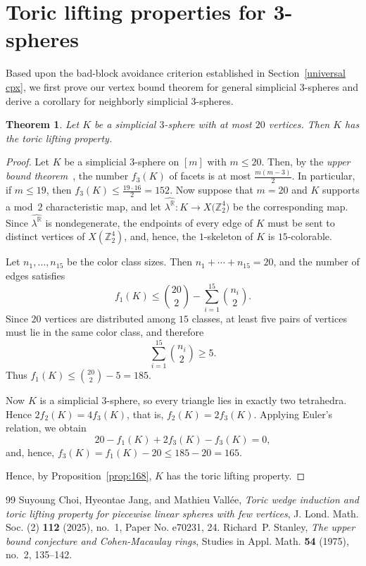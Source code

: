 \documentclass[10pt,a4paper]{amsart}
\newcommand{\Z}{\mathbb{Z}}
\newcommand{\R}{\mathbb{R}}
\newtheorem{theorem}{Theorem}[section]
\begin{document}
\section{Toric lifting properties for 3-spheres} \label{toric lifting property}

Based upon the bad-block avoidance criterion established in Section~\ref{universal cpx}, we first prove our  vertex bound theorem for general simplicial 3-spheres and derive a corollary for neighborly  simplicial 3-spheres.

\begin{theorem}\label{thm:main}
    Let $K$ be a simplicial $3$-sphere with at most $20$ vertices.
    Then $K$ has the toric lifting property.
\end{theorem}

\begin{proof}
    Let $K$ be a simplicial $3$-sphere on $[m]$ with $m \leq 20$.
    Then, by the \emph{upper bound theorem}~\cite{Stanley1975}, the number $f_3(K)$ of facets is at most $\frac{m(m-3)}{2}$.
    In particular, if $m \leq 19$, then $f_3(K) \leq \frac{19 \cdot 16}{2} = 152$.
    Now suppose that $m=20$ and $K$ supports a mod~$2$ characteristic map, and let $\widehat{\lambda^\R} \colon K\to X\bigl(\Z_2^4\bigr)$ be the corresponding map.
    Since $\widehat{\lambda^\R}$ is nondegenerate, the endpoints of every edge of $K$ must be sent to distinct vertices of $X(\Z_2^4)$, and, hence, the $1$-skeleton of $K$ is $15$-colorable.
    
    Let $n_1,\dots,n_{15}$ be the color class sizes. 
    Then $n_1+\cdots+n_{15}=20$, and the number of edges satisfies
    $$
        f_1(K) \leq \binom{20}{2}-\sum_{i=1}^{15}\binom{n_i}{2}.
    $$
    Since $20$ vertices are distributed among $15$ classes, at least five pairs of vertices must lie in the same color class, and therefore
    $$
        \sum_{i=1}^{15}\binom{n_i}{2}\ge 5.
    $$
    Thus $f_1(K)\le \binom{20}{2}-5=185$.
    
    Now $K$ is a simplicial $3$-sphere, so every triangle lies in exactly two tetrahedra. 
    Hence $2f_2(K)=4f_3(K)$, that is, $f_2(K)=2f_3(K)$.
    Applying Euler's relation, we obtain
    $$
        20-f_1(K)+2f_3(K)-f_3(K)=0,
    $$
    and, hence, $f_3(K)=f_1(K)-20\le 185-20=165$.
    
    Hence, by Proposition~\ref{prop:168}, $K$ has the toric lifting property.
\end{proof}


\begin{thebibliography}{99}
 Suyoung Choi, Hyeontae Jang, and Mathieu Vall\'ee, \emph{Toric wedge induction and toric lifting property for piecewise linear spheres with few vertices}, J. Lond. Math. Soc. (2) \textbf{112} (2025), no.~1, Paper No. e70231, 24. 
 Richard~P. Stanley, \emph{The upper bound conjecture and {C}ohen-{M}acaulay rings}, Studies in Appl. Math. \textbf{54} (1975), no.~2, 135--142. 
\end{thebibliography}
\end{document}
